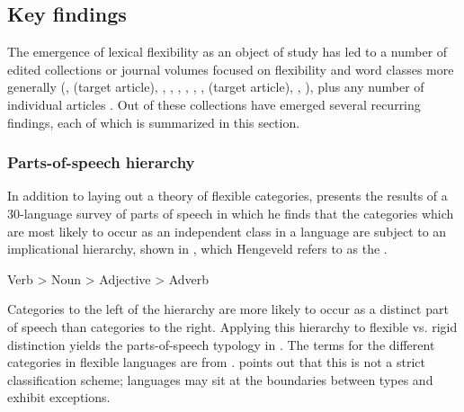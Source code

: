 \subsection{Key findings}
\label{sec:2.3.2}

The emergence of lexical flexibility as an object of study has led to a number of edited collections or journal volumes focused on flexibility and word classes more generally (\cite{VogelComrie2000}, \cite{EvansOsada2005} (target article), \cite{AnsaldoDonPfau2010}, \cite{LoisVapnarsky2003}, \cite{RijkhoffLier2013}, \cite{SimoneMasini2014}, \cite{BlaszczakKlimekJankowskaMigdalski2015}, \cite{VapnarskyVeneziano2017b}, \cite{Lier2017} (target article), \cite{VapnarskyVeneziano2017a}, \cite{CuyckensHeyvaertHartmann2019}), plus any number of individual articles . Out of these collections have emerged several recurring findings, each of which is summarized in this section.

\subsubsection{Parts-of-speech hierarchy}
\label{sec:2.3.2.1}

In addition to laying out a theory of flexible categories, \textcite{Hengeveld1992} presents the results of a 30-language survey of parts of speech in which he finds that the categories which are most likely to occur as an independent class in a language are subject to an implicational hierarchy, shown in , which Hengeveld refers to as the .

\begin{exe}
  \ex\label{ex:2.8} Verb > Noun > Adjective > Adverb
\end{exe}

\noindent Categories to the left of the hierarchy are more likely to occur as a distinct part of speech than categories to the right. Applying this hierarchy to  flexible vs. rigid distinction yields the parts-of-speech typology in  . The terms for the different categories in flexible languages are from \textcite{HengeveldRijkhoffSiewierska2004}. \citeauthor{Hengeveld1992} points out that this is not a strict classification scheme; languages may sit at the boundaries between types and exhibit exceptions.

